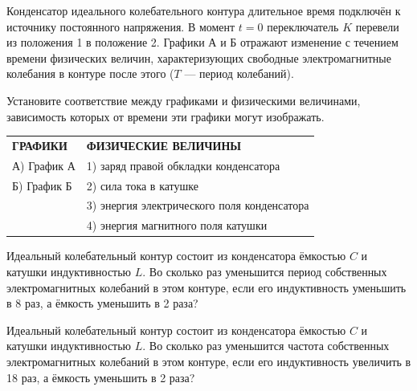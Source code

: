 \begin{taskbasic}[code={\label{task:elem_osc_v20_n15}}]
Конденсатор идеального колебательного контура длительное время подключён к источнику постоянного напряжения. В момент $t = 0$ переключатель $K$ перевели из положения 1 в положение 2. Графики А и Б отражают изменение с течением времени физических величин, характеризующих свободные электромагнитные колебания в контуре после этого ($T$ --- период колебаний).

Установите соответствие между графиками и физическими величинами, зависимость которых от времени эти графики могут изображать.

\smallskip
\begin{tabular}{p{}p{}}
\textbf{ГРАФИКИ} & \textbf{ФИЗИЧЕСКИЕ ВЕЛИЧИНЫ} \\
А) График А & 1) заряд правой обкладки конденсатора \\
Б) График Б & 2) сила тока в катушке \\
& 3) энергия электрического поля конденсатора \\
& 4) энергия магнитного поля катушки
\end{tabular}

\end{taskbasic}


\begin{taskbasic}[code={\label{task:elem_osc_v21_n13}}]
Идеальный колебательный контур состоит из конденсатора ёмкостью $C$ и катушки индуктивностью $L$. Во сколько раз уменьшится период собственных электромагнитных колебаний в этом контуре, если его индуктивность уменьшить в 8 раз, а ёмкость уменьшить в 2 раза?

\end{taskbasic}

\begin{taskbasic}[code={\label{task:elem_osc_v22_n13}}]
Идеальный колебательный контур состоит из конденсатора ёмкостью $C$ и катушки индуктивностью $L$. Во сколько раз уменьшится частота собственных электромагнитных колебаний в этом контуре, если его индуктивность увеличить в 18 раз, а ёмкость уменьшить в 2 раза?

\end{taskbasic}

